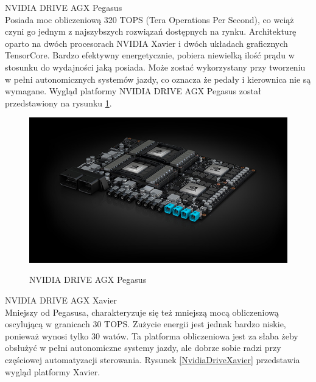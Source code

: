 \begin{enumerate*}
\item NVIDIA DRIVE AGX Pegasus \\
Posiada moc obliczeniową 320 TOPS (Tera Operations Per Second), co wciąż czyni go jednym z najszybszych rozwiązań dostępnych na rynku.
Architekturę oparto na dwóch procesorach NVIDIA Xavier i dwóch układach graficznych TensorCore. Bardzo efektywny energetycznie, pobiera niewielką ilość prądu w stosunku do wydajności jaką posiada. Może zostać wykorzystany przy tworzeniu w pełni autonomicznych systemów jazdy, co oznacza że pedały i kierownica nie są wymagane. Wygląd platformy NVIDIA DRIVE AGX Pegasus został przedstawiony na rysunku \ref{NvidiaDrivePegasus}. \\
\begin{figure}[h]
\begin{center}
\includegraphics[width=14.5cm]{resources/figures/nv-drive-pegasus.jpg}
\caption{NVIDIA DRIVE AGX Pegasus}
\label{NvidiaDrivePegasus}
\end{center}
\end{figure}
\newpage
\item NVIDIA DRIVE AGX Xavier \\
Mniejszy od Pegasusa, charakteryzuje się też mniejszą mocą obliczeniową oscylującą w granicach 30 TOPS. Zużycie energii jest jednak bardzo niskie, ponieważ wynosi tylko 30 watów. Ta platforma obliczeniowa jest za słaba żeby obsłużyć w pełni autonomiczne systemy jazdy, ale dobrze sobie radzi przy częściowej automatyzacji sterowania. Rysunek \ref{NvidiaDriveXavier} przedstawia wygląd platformy Xavier. \\


\end{enumerate*}
